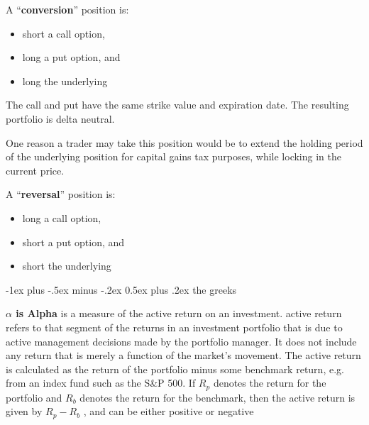 \documentclass[10pt,landscape]{article}
\makeatletter
\renewcommand{\section}{\@startsection{section}{1}{0mm}%
                                {-1ex plus -.5ex minus -.2ex}%
                                {0.5ex plus .2ex}%
                                {\normalfont\large\bfseries}}
\makeatother
\begin{document}
\begin{multicols}{3}
\vspace{0.15cm}

A ``\textbf{conversion}'' position is:

\vspace{0.15cm}

\begin{itemize}
	\item short  a call option,
	\item long  a put option, and 
	\item long the underlying
\end{itemize}

\vspace{0.15cm}

The call and put have the same strike  value and expiration date. The resulting portfolio is delta neutral.

\vspace{0.15cm}

One reason a trader may take this position would be to extend the holding period of the underlying position for capital gains tax purposes, while locking in the current price.

\vspace{0.15cm}

A ``\textbf{reversal}'' position is:

\vspace{0.15cm}

\begin{itemize}
	\item long  a call option,
	\item short  a put option, and 
	\item short the underlying
\end{itemize}

\vspace{0.15cm}

\section{the greeks}

\vspace{0.15cm}

\textbf{$\alpha$ is Alpha} is a measure of the active return on an investment.
 active return refers to that segment of the returns in an investment portfolio that is due to active management decisions made by the portfolio manager. It does not include any return that is merely a function of the market's movement. The active return is calculated as the return of the portfolio minus some benchmark return, e.g. from an index fund such as the S\&P 500. If $R_p$ denotes the return for the portfolio and $R_b$ denotes the return for the benchmark, then the active return is given by $R_{p}-R_{b}$ , and can be either positive or negative
 

\end{multicols}
\end{document}
